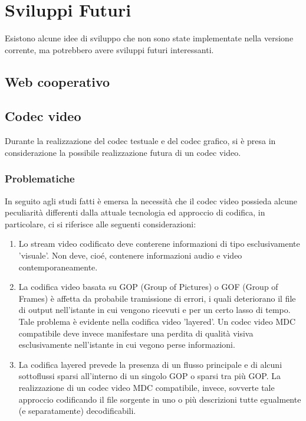 \chapter{Sviluppi Futuri}
\label{cap:sviluppi_futuri}
Esistono alcune idee di sviluppo che non sono state implementate nella versione
corrente, ma potrebbero avere sviluppi futuri interessanti.


\section{Web cooperativo}

\section{Codec video}
Durante la realizzazione del codec testuale e del codec grafico, si è presa in
considerazione la possibile realizzazione futura di un codec video.

\subsection{Problematiche}

In seguito agli studi fatti è emersa la necessità che il codec video possieda
alcune peculiarità differenti dalla attuale tecnologia ed approccio di codifica, in
particolare, ci si riferisce alle seguenti considerazioni:

\begin{enumerate}
\item Lo stream video codificato deve conterene informazioni di tipo
esclusivamente 'visuale'. Non deve, cioé, contenere informazioni audio e video
contemporaneamente.

\item La codifica video basata su GOP (Group of Pictures) o GOF (Group of
Frames) è affetta da probabile tramissione di errori, i quali deteriorano il
file di output nell'istante in cui vengono ricevuti e per un certo lasso di
tempo. Tale problema è evidente nella codifica video 'layered'. Un codec video
MDC compatibile deve invece manifestare una perdita di qualità visiva
esclusivamente nell'istante in cui vegono perse informazioni.

\item La codifica layered prevede la presenza di un flusso principale e di
alcuni sottoflussi sparsi all'interno di un singolo GOP o sparsi tra più GOP.
La realizzazione di un codec video MDC compatibile, invece, sovverte tale
approccio codificando il file sorgente in uno o più descrizioni tutte egualmente
(e separatamente) decodificabili.
\end{enumerate}

